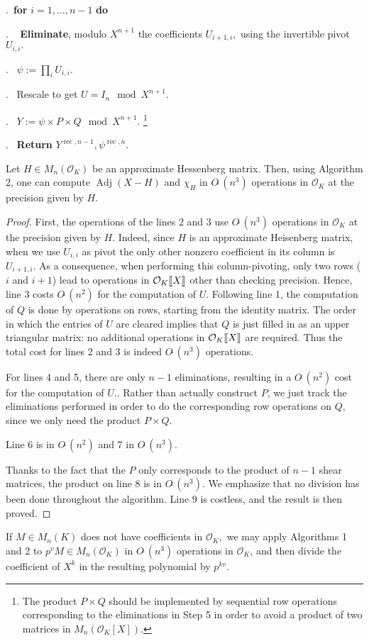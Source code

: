 \documentclass{sig-alternate-05-2015}
\DeclareMathOperator{\adj}{Adj}
\DeclareMathOperator{\rec}{rec}
\newcommand{\OK}{\mathcal{O}_K}
\newcommand{\llb}{[\mkern-2.5mu[}
\newcommand{\rrb}{]\mkern-2.5mu]}
\newcommand{\softO}{O\tilde{~}}
\begin{document}
.\    {\bf for} $i=1,\dots,n-1$ {\bf do} 

. \  \:  \textbf{Eliminate}, modulo $X^{n+1}$ the coefficients $U_{i+1,i},$
using the invertible pivot $U_{i,i}.$

. \ $\psi:=\prod_i U_{i,i}.$

. \ Rescale to get $U = I_n \mod X^{n+1}.$

. \ $Y:=\psi \times P \times Q   \mod X^{n+1}.$ \footnote{The product $P \times Q$
should be implemented by sequential row operations corresponding to the eliminations in Step 5
in order to avoid a product of two matrices in $M_n(\OK[X])$.}

. \ \textbf{Return} $Y^{\rec,n-1}, \psi^{\rec,n}.$

\vspace{-1ex}\noindent\hrulefill

\medskip

\begin{theo}
Let $H \in M_n(\OK)$ be an approximate Hessenberg matrix.
Then, using Algorithm 2, one can compute $\adj (X -H)$
and $\chi_H$ in 
$\softO (n^3)$ operations in $\OK$ at the precision given by $H.$
\end{theo}
\begin{proof}
First, the operations of the lines 2 and 3 use $\softO (n^3)$ operations
in $\OK$ at the precision given by $H.$
Indeed, since $H$ is an approximate Heisenberg matrix, when we use $U_{i,i}$ as pivot
the only other nonzero coefficient in its column is $U_{i+1,i}$.
As a consequence, when performing this column-pivoting, only two rows ($i$ and
$i+1$) lead to operations in $\OK \llb X \rrb$ other than checking precision.
Hence, line 3 costs $\softO (n^2)$ for the computation of $U.$
Following line 1, the computation of $Q$ is done by operations on rows, starting from the identity matrix.
The order in which the entries of $U$ are cleared implies that $Q$ is just filled in as an upper triangular matrix:
no additional operations in $\OK\llb X\rrb$ are required. Thus the total cost
for lines 2 and 3 is indeed $\softO (n^3)$ operations.

For lines 4 and 5, there are only $n-1$ eliminations, resulting in a $\softO (n^2)$ cost
for the computation of $U.$. Rather than actually construct $P$, we just track the eliminations
performed in order to do the corresponding row operations on $Q$, since we only need the product $P \times Q$.

Line 6 is in $\softO (n^2)$ and 7 in $\softO (n^3).$

Thanks to the fact that the $P$ only corresponds to the product of $n-1$ 
shear matrices, the
product on line 8 is in $\softO (n^3).$
We emphasize that no division has been done throughout the algorithm.
Line 9 is costless, and the result is then proved.
\end{proof}
\begin{rem}
If $M \in M_n(K)$ does not have coefficients in $\OK,$
we may apply Algorithms 1 and 2 to $p^v M \in M_n(\OK)$
in $\softO (n^3)$ operations in $\OK$, and then divide
the coefficient of $X^k$ in the resulting polynomial by $p^{kv}$.
\end{rem}
\end{document}

